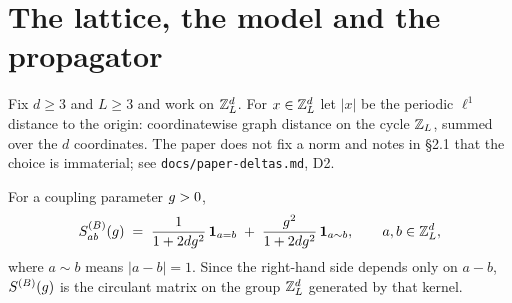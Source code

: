 %
%
%
%

\chapter{The lattice, the model and the propagator}

\begin{definition}\label{def:lattice}
  \leanok
  Fix $d\ge3$ and $L\ge3$ and work on $\mathbb{Z}_L^d$.  For $x\in\mathbb{Z}_L^d$ let $|x|$ be the periodic
  $\ell^1$ distance to the origin: coordinatewise graph distance on the cycle
  $\mathbb{Z}_L$, summed over the $d$ coordinates.  The paper does not fix a norm and notes
  in \S2.1 that the choice is immaterial; see \texttt{docs/paper-deltas.md}, D2.
\end{definition}

\begin{definition}\label{def:SB}
  \leanok
  For a coupling parameter $g>0$,
  \[ S^{(B)}_{ab}(g) \;=\; \frac{1}{1+2dg^2}\,\mathbf 1_{a=b}
     \;+\; \frac{g^2}{1+2dg^2}\,\mathbf 1_{a\sim b},\qquad a,b\in\mathbb{Z}_L^d, \]
  where $a\sim b$ means $|a-b|=1$.  Since the right-hand side depends only on $a-b$,
  $S^{(B)}(g)$ is the circulant matrix on the group $\mathbb{Z}_L^d$ generated by that kernel.
\end{definition}


